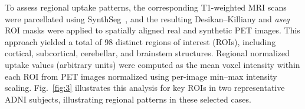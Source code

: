 To assess regional uptake patterns, the corresponding T1-weighted MRI scans were parcellated using SynthSeg~\cite{synthseg}, and the resulting Desikan--Killiany and \textit{aseg} ROI masks were applied to spatially aligned real and synthetic PET images. This approach yielded a total of 98 distinct regions of interest (ROIs), including cortical, subcortical, cerebellar, and brainstem structures. Regional normalized uptake values (arbitrary units) were computed as the mean voxel intensity within each ROI from PET images normalized using per-image min--max intensity scaling. Fig.~\ref{fig:3} illustrates this analysis for key ROIs in two representative ADNI subjects, illustrating regional patterns in these selected cases.
